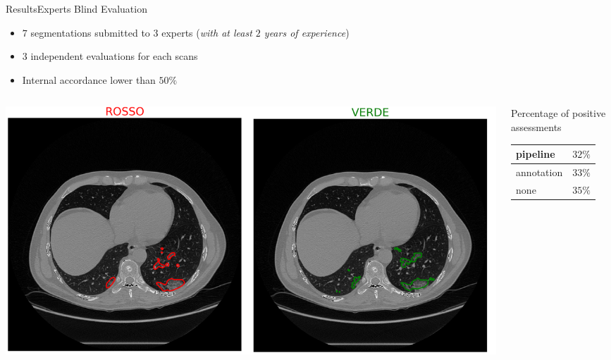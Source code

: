 \documentclass{standalone}
\begin{document}
	\begin{frame}{Results}{Experts Blind Evaluation}
		\begin{block}{}
			\begin{itemize}
				\item $7$ segmentations submitted to $3$ experts (\emph{with at least $2$ years of experience})
				\item $3$ independent evaluations for each scans 
				\item Internal accordance lower than $50\%$
				
			\end{itemize}
		\end{block}
		\begin{columns}
			\begin{column}{.6\textwidth}
				\centering\includegraphics[width=\linewidth]{./img/BlindEval}
			\end{column}
			\begin{column}{.3\textwidth}
				\begin{block}{}\scriptsize
					Percentage of positive assessments
					\begin{table}
						\begin{tabular}{|l|l|}
							\hline
							pipeline 	& $32 \%$\\ \hline
							annotation 	& $33 \%$\\ \hline
							none 		& $35 \%$\\	\hline			
						\end{tabular}
					\end{table}
				\end{block}
			\end{column}
		\end{columns}
	\end{frame}
\end{document}
